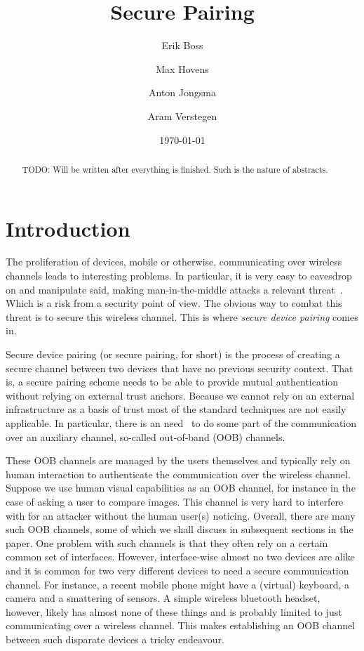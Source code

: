 \documentclass[conference, 12pt]{sty/IEEEtran}
\title{Secure Pairing}
\author{Erik Boss \and Max Hovens \and Anton Jongsma \and Aram Verstegen}
\date{\today}
\begin{document}
\maketitle

\begin{abstract}
    TODO: Will be written after everything is finished. Such is the nature of abstracts.
\end{abstract}

\section{Introduction}
\label{sec:introduction}

The proliferation of devices, mobile or otherwise, communicating over wireless channels leads to interesting problems.
In particular, it is very easy to eavesdrop on and manipulate said, making man-in-the-middle attacks a relevant threat~\cite{kumar2009comparative}.
Which is a risk from a security point of view.
The obvious way to combat this threat is to secure this wireless channel.
This is where \emph{secure device pairing} comes in.

Secure device pairing (or secure pairing, for short) is the process of creating a secure channel between two devices that have no previous security context.
That is, a secure pairing scheme needs to be able to provide mutual authentication without relying on external trust anchors.
Because we cannot rely on an external infrastructure as a basis of trust most of the standard techniques are not easily applicable.
In particular, there is an need~\cite{kumar2009comparative} to do some part of the communication over an auxiliary channel, so-called out-of-band (OOB) channels.

These OOB channels are managed by the users themselves and typically rely on human interaction to authenticate the communication over the wireless channel.
Suppose we use human visual capabilities as an OOB channel, for instance in the case of asking a user to compare images.
This channel is very hard to interfere with for an attacker without the human user(s) noticing.
Overall, there are many such OOB channels, some of which we shall discuss in subsequent sections in the paper.
One problem with such channels is that they often rely on a certain common set of interfaces.
However, interface-wise almost no two devices are alike and it is common for two very different devices to need a secure communication channel.
For instance, a recent mobile phone might have a (virtual) keyboard, a camera and a smattering of sensors.
A simple wireless bluetooth headset, however, likely has almost none of these things and is probably limited to just communicating over a wireless channel.
This makes establishing an OOB channel between such disparate devices a tricky endeavour.
\end{document}
